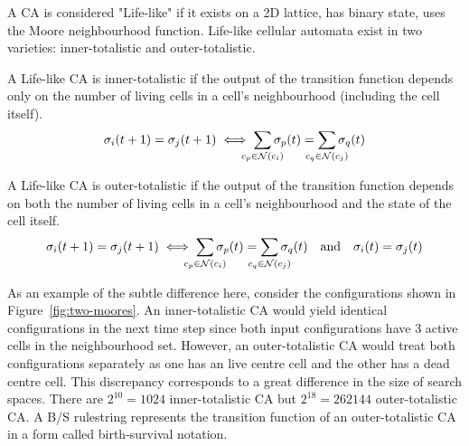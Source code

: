 A CA is considered "Life-like" if it exists on a 2D lattice, has binary state, uses the Moore neighbourhood function. Life-like cellular automata exist in two varieties: inner-totalistic and outer-totalistic.

\begin{definition}
A Life-like CA is inner-totalistic if the output of the transition function depends only on the number of living cells in a cell's neighbourhood (including the cell itself).
\[
  \sigma_i(t+1) = \sigma_j(t+1) \iff \sum_{\mathclap{c_p \in \mathcal{N}(c_i)}}\sigma_p(t) = \sum_{\mathclap{c_q \in \mathcal{N}(c_j)}}\sigma_q(t)
\]
\end{definition}

\begin{definition}
A Life-like CA is outer-totalistic if the output of the transition function depends on both the number of living cells in a cell's neighbourhood and the state of the cell itself.
\[
  \sigma_i(t+1) = \sigma_j(t+1) \iff \sum_{\mathclap{c_p \in \mathcal{N}(c_i)}}\sigma_p(t) = \sum_{\mathclap{c_q \in \mathcal{N}(c_j)}}\sigma_q(t) \quad \textnormal{and} \quad \sigma_i(t) = \sigma_j(t) 
\]
\end{definition}

As an example of the subtle difference here, consider the configurations shown in Figure~\ref{fig:two-moores}. An inner-totalistic CA would yield identical configurations in the next time step since both input configurations have 3 active cells in the neighbourhood set. However, an outer-totalistic CA would treat both configurations separately as one has an live centre cell and the other has a dead centre cell. This discrepancy corresponds to a great difference in the size of search spaces. There are $2^{10}=1024$ inner-totalistic CA but $2^{18} = 262144$ outer-totalistic CA. A B/S rulestring represents the transition function of an outer-totalistic CA in a form called birth-survival notation.\\


